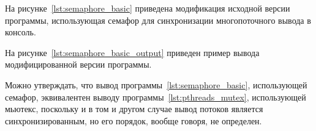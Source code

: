 На рисунке~\ref{lst:semaphore_basic} приведена модификация исходной версии программы,
использующая семафор для синхронизации многопоточного вывода в консоль.
\pagebreak



На рисунке~\ref{lst:semaphore_basic_output} приведен пример
вывода модифицированной версии программы.



Можно утверждать, что вывод программы~\ref{lst:semaphore_basic},
использующей семафор, эквивалентен выводу программы~\ref{lst:pthreads_mutex},
использующей мьютекс, поскольку и в том и другом случае вывод потоков является
синхронизированным, но его порядок, вообще говоря, не определен.
